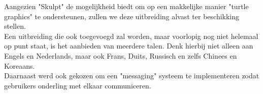 Aangezien "Skulpt" de mogelijkheid biedt om op een makkelijke manier "turtle graphics" te ondersteunen,
zullen we deze uitbreiding alvast ter beschikking stellen. \\
Een uitbreiding die ook toegevoegd zal worden, maar voorlopig nog niet helemaal op punt staat,
is het aanbieden van meerdere talen. Denk hierbij niet alleen aan Engels en Nederlands, maar ook Frans,
Duits, Russisch en zelfs Chinees en Koreaans. \\
Daarnaast werd ook gekozen om een "messaging" systeem te implementeren zodat gebruikers onderling met elkaar communiceren.
